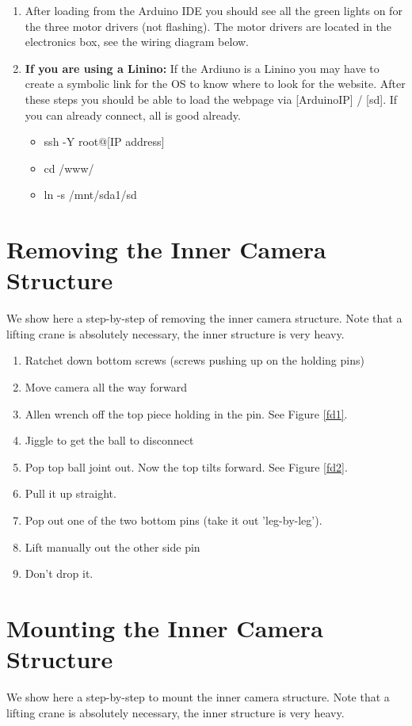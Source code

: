 \documentclass[11pt]{article}
\begin{document}
\begin{enumerate}
\item After loading from the Arduino IDE you should see all the green lights on for the three motor drivers (not flashing).  
The motor drivers are located in the electronics box, see the wiring diagram below.

\item {\textbf{If you are using a Linino:}}  If the Ardiuno is a Linino you may have to create a symbolic link for the OS to know where to look for the website.  
After these steps you should be able to load the webpage via [ArduinoIP] / [sd].  
If you can already connect, all is good already.
	\begin{itemize}
		\item ssh -Y root@[IP address]
		\item cd /www/
		\item ln -s /mnt/sda1/sd
	\end{itemize}
\end{enumerate}


\section{Removing the Inner Camera Structure}
We show here a step-by-step of removing the inner camera structure.  
Note that a lifting crane is absolutely necessary, the inner structure is very heavy.

\begin{enumerate}
\item Ratchet down bottom screws (screws pushing up on the holding pins)
\item Move camera all the way forward
\item Allen wrench off the top piece holding in the pin.  See Figure \ref{fd1}.
\item Jiggle to get the ball to disconnect
\item Pop top ball joint out.  Now the top tilts forward.  See Figure \ref{fd2}.
\item Pull it up straight.
\item Pop out one of the two bottom pins (take it out 'leg-by-leg'). 
\item Lift manually out the other side pin
\item Don't drop it.  
\end{enumerate}

\section{Mounting the Inner Camera Structure}
We show here a step-by-step to mount the inner camera structure.  
Note that a lifting crane is absolutely necessary, the inner structure is very heavy.
\end{document}
